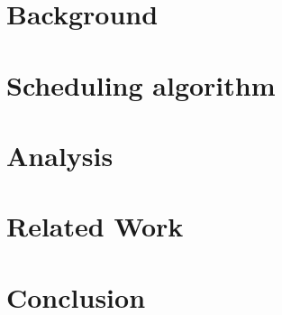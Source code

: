 \documentclass[conference]{IEEEtran}
\begin{document}
\section{Background}

\section{Scheduling algorithm}

\section{Analysis}

\section{Related Work}

\section{Conclusion}


\nocite{*}



\end{document}
